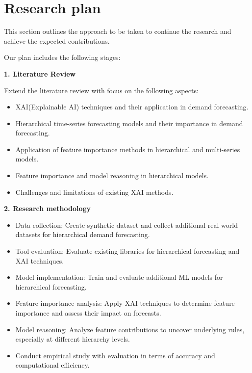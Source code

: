 
\section{Research plan} \label{sec:research_plan}
This section outlines the approach to be taken to continue the research and achieve the expected contributions.

Our plan includes the following stages:

\textbf{1. Literature Review}

Extend the literature review with focus on the following aspects:
\begin{itemize}
    \item XAI(Explainable AI) techniques and their application in demand forecasting.
    \item Hierarchical time-series forecasting models and their importance in demand forecasting.
    \item Application of feature importance methods in hierarchical and multi-series models.
    \item Feature importance and model reasoning in hierarchical models.
    \item Challenges and limitations of existing XAI methods.
\end{itemize}

\textbf{2. Research methodology}

\begin{itemize}
    \item Data collection: Create synthetic dataset and collect additional real-world datasets for hierarchical demand forecasting.
    \item Tool evaluation: Evaluate existing libraries for hierarchical forecasting and XAI techniques.
    \item Model implementation: Train and evaluate additional ML models for hierarchical forecasting.
    \item Feature importance analysis: Apply XAI techniques to determine feature importance and assess their impact on forecasts.
    \item Model reasoning: Analyze feature contributions to uncover underlying rules, especially at different hierarchy levels.
    \item Conduct empirical study with evaluation in terms of accuracy and computational efficiency.
\end{itemize}





